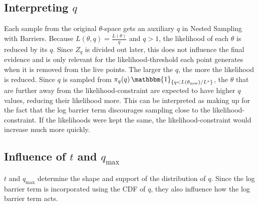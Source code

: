 \documentclass[12pt, a4paper]{report}
\begin{document}
\subsection{Interpreting $q$}
Each sample from the original $\theta$-space gets an auxiliary $q$ in Nested Sampling with Barriers.
Because $L(\theta, q) = \frac{L(\theta)}{q}$ and $q > 1$, the likelihood of each $\theta$ is reduced by its $q$.
Since $Z_q$ is divided out later, this does not influence the final evidence and is only relevant for the likelihood-threshold each point generates when it is removed from the live points.
The larger the $q$, the more the likelihood is reduced.
Since $q$ is sampled from $\pi_q(q) \, \mathbbm{1}_{\{q < L(\theta_{\textrm{new}}) / L^*\}}$, the $\theta$ that are further away from the likelihood-constraint are expected to have higher $q$ values, reducing their likelihood more.
This can be interpreted as making up for the fact that the log barrier term discourages sampling close to the likelihood-constraint.
If the likelihoods were kept the same, the likelihood-constraint would increase much more quickly.

\subsection{Influence of $t$ and $q_{\textrm{max}}$}
$t$ and $q_{\textrm{max}}$ determine the shape and support of the distribution of $q$.
Since the log barrier term is incorporated using the CDF of $q$, they also influence how the log barrier term acts.
\end{document}
